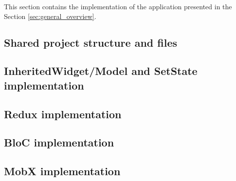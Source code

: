 This section contains the implementation of the application presented  in the Section \ref{sec:general_overview}.

\subsection{Shared project structure and files}
\label{subsec:todo_app_shared_project_structure}


\subsection{InheritedWidget/Model and SetState implementation}
\label{subsec:todo_app_inheritedwidget_implementation}


\subsection{Redux implementation}
\label{subsec:todo_app_redux_implementation}


\subsection{BloC implementation}
\label{subsec:todo_app_bloc_implementation}


\subsection{MobX implementation}
\label{subsec:todo_app_mobx_implementation}

